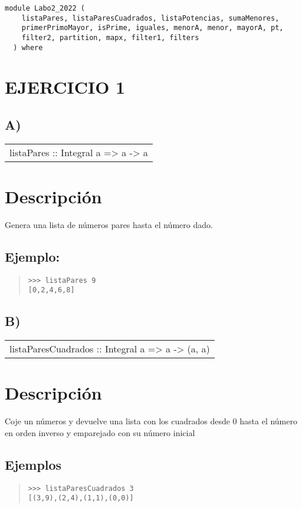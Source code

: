 \label{module:Labo2_2022}
\haddockbeginheader
{\haddockverb\begin{verbatim}
module Labo2_2022 (
    listaPares, listaParesCuadrados, listaPotencias, sumaMenores,
    primerPrimoMayor, isPrime, iguales, menorA, menor, mayorA, pt,
    filter2, partition, mapx, filter1, filters
  ) where\end{verbatim}}
\haddockendheader

\section{EJERCICIO 1}
\subsection{A)}
\begin{haddockdesc}
\item[\begin{tabular}{@{}l}
listaPares :: Integral a => a -> {\char 91}a{\char 93}
\end{tabular}]
{\haddockbegindoc
\section*{Descripción}
Genera una lista de números pares hasta el número dado.\par
\subsection*{Ejemplo:}
\begin{quote}
{\haddockverb\begin{verbatim}
>>> listaPares 9
[0,2,4,6,8]

\end{verbatim}}
\end{quote}}
\end{haddockdesc}
\subsection{B)}
\begin{haddockdesc}
\item[\begin{tabular}{@{}l}
listaParesCuadrados :: Integral a => a -> {\char 91}(a, a){\char 93}
\end{tabular}]
{\haddockbegindoc
\section*{Descripción}
Coje un números y devuelve una lista con los cuadrados desde 0 hasta el número en orden inverso y emparejado con su número inicial\par
\subsection*{Ejemplos}
\begin{quote}
{\haddockverb\begin{verbatim}
>>> listaParesCuadrados 3
[(3,9),(2,4),(1,1),(0,0)]

\end{verbatim}}
\end{quote}}
\end{haddockdesc}

